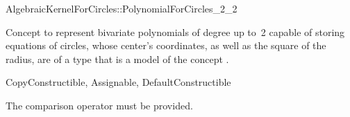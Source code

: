 \begin{ccRefConcept}{AlgebraicKernelForCircles::PolynomialForCircles_2_2}

\ccDefinition

Concept to represent
bivariate polynomials of degree up to~2 capable of storing equations
of circles, whose center's coordinates, as well as the square of the radius, 
are of a type that is a model of the concept
.

\ccRefines
CopyConstructible, Assignable, DefaultConstructible

\ccCreation
{}




\ccOperations

The comparison operator \ccc{==} must be provided. 


\ccHasModels


\ccSeeAlso


\end{ccRefConcept}


